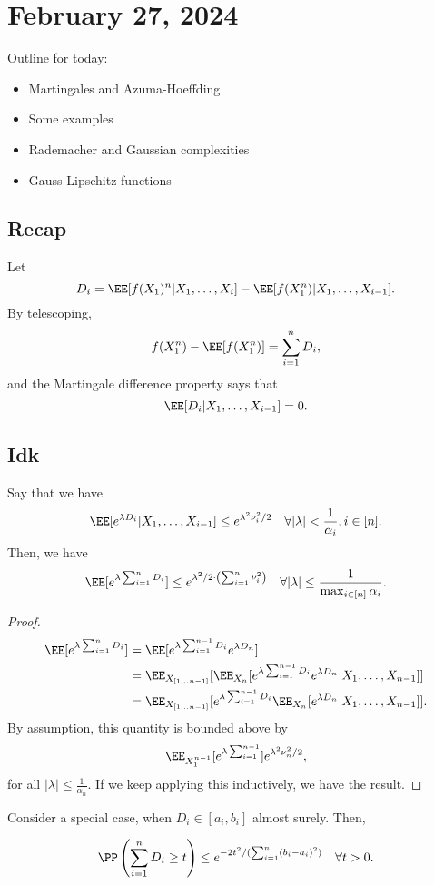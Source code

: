 \section{February 27, 2024}

Outline for today: 
\begin{itemize}
	\item Martingales and Azuma-Hoeffding
	\item Some examples 
	\item Rademacher and Gaussian complexities
	\item Gauss-Lipschitz functions
\end{itemize}

\subsection{Recap}

Let
\[D_i = \EE[f(X_1)^n|X_1,\hdots,X_i] - \EE[f(X_1^n) | X_1,\hdots, X_{i-1}].\] 
By telescoping,
\[f(X_1^n) - \EE[f(X_1^n)] = \sum_{i=1}^nD_i,\]
and the Martingale difference property says that 
\[\EE[D_i|X_1,\hdots,X_{i-1}]=0.\] 

\subsection{Idk}

\begin{theorem}
\claimlabel 

Say that we have 
\[\EE[e^{\lambda D_i}|X_1,\hdots,X_{i-1}]\leq e^{\lambda^2 \nu_i^2/2}\quad \forall \vert\lambda\vert < \frac{1}{\alpha_i},i\in [n].\]
Then, we have 
\[\EE[e^{\lambda \sum_{i=1}^n D_i}]\leq e^{\lambda^2/2\cdot \left(\sum_{i=1}^n \nu_i^2\right)}\quad \forall \vert \lambda\vert \leq \frac{1}{\max_{i\in [n]}\alpha_i}.\]
\end{theorem}
\begin{proof}
\begin{align*}
	\EE[e^{\lambda \sum_{i=1}^n D_i}] &= \EE[e^{\lambda \sum_{i=1}^{n-1}D_i}e^{\lambda D_n}] \\
																		&= \EE_{X_{[1...n-1]}}[\EE_{X_n}[e^{\lambda \sum_{i=1}^{n-1}D_i}e^{\lambda D_n}|X_1,\hdots, X_{n-1}]] \\
																		&= \EE_{X_{[1...n-1]}}[e^{\lambda \sum_{i=1}^{n-1}D_i}\EE_{X_n}[e^{\lambda D_n}|X_1,\hdots,X_{n-1}]]. 
\end{align*}
By assumption, this quantity is bounded above by 
\[\EE_{X_1^{n-1}}[e^{\lambda \sum_{i=1}^{n-1}}]e^{\lambda^2\nu_n^2/2},\]
for all $\vert \lambda\vert \leq \frac{1}{\alpha_n}$. If we keep applying this inductively, we have the result. 
\end{proof}
\begin{theorem}

Consider a special case, when $D_i\in [a_i,b_i]$ almost surely. Then,

\[\PP\left(\sum_{i=1}^n D_i\geq t\right)\leq e^{-2t^2/(\sum_{i=1}^n (b_i-a_i)^2)}\quad \forall t > 0.\] 
\end{theorem}

